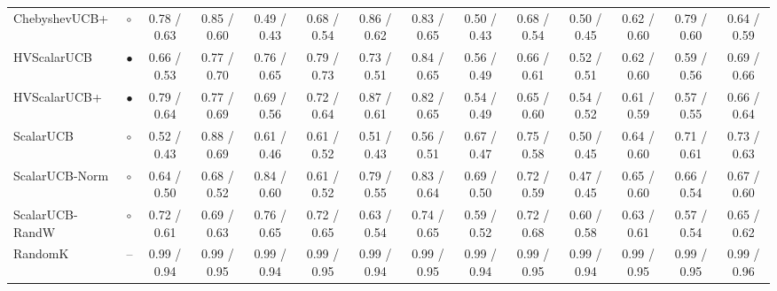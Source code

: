 \begin{tabular}{llcccccccccccc}
ChebyshevUCB+ & $\circ$ & 0.78 / 0.63 & 0.85 / 0.60 & 0.49 / 0.43 & 0.68 / 0.54 & 0.86 / 0.62 & 0.83 / 0.65 & 0.50 / 0.43 & 0.68 / 0.54 & 0.50 / 0.45 & 0.62 / 0.60 & 0.79 / 0.60 & 0.64 / 0.59\\
HVScalarUCB & $\bullet$ & 0.66 / 0.53 & 0.77 / 0.70 & 0.76 / 0.65 & 0.79 / 0.73 & 0.73 / 0.51 & 0.84 / 0.65 & 0.56 / 0.49 & 0.66 / 0.61 & 0.52 / 0.51 & 0.62 / 0.60 & 0.59 / 0.56 & 0.69 / 0.66\\
HVScalarUCB+ & $\bullet$ & 0.79 / 0.64 & 0.77 / 0.69 & 0.69 / 0.56 & 0.72 / 0.64 & 0.87 / 0.61 & 0.82 / 0.65 & 0.54 / 0.49 & 0.65 / 0.60 & 0.54 / 0.52 & 0.61 / 0.59 & 0.57 / 0.55 & 0.66 / 0.64\\
ScalarUCB & $\circ$ & 0.52 / 0.43 & 0.88 / 0.69 & 0.61 / 0.46 & 0.61 / 0.52 & 0.51 / 0.43 & 0.56 / 0.51 & 0.67 / 0.47 & 0.75 / 0.58 & 0.50 / 0.45 & 0.64 / 0.60 & 0.71 / 0.61 & 0.73 / 0.63\\
ScalarUCB-Norm & $\circ$ & 0.64 / 0.50 & 0.68 / 0.52 & 0.84 / 0.60 & 0.61 / 0.52 & 0.79 / 0.55 & 0.83 / 0.64 & 0.69 / 0.50 & 0.72 / 0.59 & 0.47 / 0.45 & 0.65 / 0.60 & 0.66 / 0.54 & 0.67 / 0.60\\
ScalarUCB-RandW & $\circ$ & 0.72 / 0.61 & 0.69 / 0.63 & 0.76 / 0.65 & 0.72 / 0.65 & 0.63 / 0.54 & 0.74 / 0.65 & 0.59 / 0.52 & 0.72 / 0.68 & 0.60 / 0.58 & 0.63 / 0.61 & 0.57 / 0.54 & 0.65 / 0.62\\
RandomK & -- & 0.99 / 0.94 & 0.99 / 0.95 & 0.99 / 0.94 & 0.99 / 0.95 & 0.99 / 0.94 & 0.99 / 0.95 & 0.99 / 0.94 & 0.99 / 0.95 & 0.99 / 0.94 & 0.99 / 0.95 & 0.99 / 0.95 & 0.99 / 0.96\\
\bottomrule
\end{tabular}
